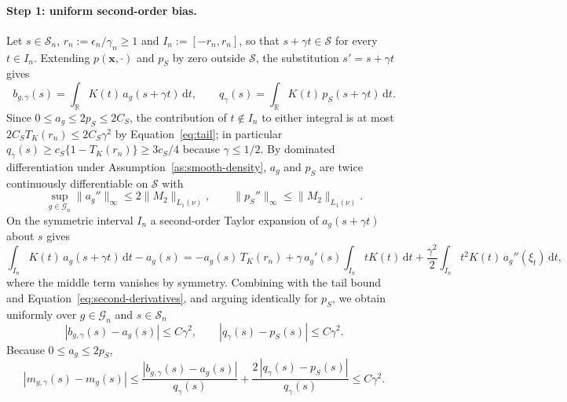 \paragraph{Step 1: uniform second-order bias.}
Let $s\in\mathcal{S}_n$, $r_n:=\epsilon_n/\gamma_n\ge1$ and $I_n:=[-r_n,r_n]$, so that $s+\gamma t\in\mathcal{S}$ for every $t\in I_n$.  Extending $p(\mathbf{x},\cdot)$ and $p_S$ by zero outside $\mathcal{S}$, the substitution $s'=s+\gamma t$ gives
\begin{equation}
  b_{g,\gamma}(s)=\int_{\mathbb{R}}K(t)\,a_g(s+\gamma t)\,\mathrm{d}t,
  \qquad
  q_\gamma(s)=\int_{\mathbb{R}}K(t)\,p_S(s+\gamma t)\,\mathrm{d}t .
  \label{eq:full-mass}
\end{equation}
Since $0\le a_g\le2p_S\le2C_S$, the contribution of $t\notin I_n$ to either integral is at most $2C_ST_K(r_n)\le2C_S\gamma^2$ by Equation~\ref{eq:tail}; in particular $q_\gamma(s)\ge c_S\{1-T_K(r_n)\}\ge3c_S/4$ because $\gamma\le1/2$.  By dominated differentiation under Assumption~\ref{as:smooth-density}, $a_g$ and $p_S$ are twice continuously differentiable on $\mathcal{S}$ with
\begin{equation}
  \sup_{g\in\mathcal{G}_n}\lVert a_g''\rVert_\infty
  \le2\lVert M_2\rVert_{L_1(\nu)},
  \qquad
  \lVert p_S''\rVert_\infty\le\lVert M_2\rVert_{L_1(\nu)} .
  \label{eq:second-derivatives}
\end{equation}
On the symmetric interval $I_n$ a second-order Taylor expansion of $a_g(s+\gamma t)$ about $s$ gives
\[
  \int_{I_n}K(t)\,a_g(s+\gamma t)\,\mathrm{d}t-a_g(s)
  =-a_g(s)\,T_K(r_n)
   +\gamma\,a_g'(s)\int_{I_n}tK(t)\,\mathrm{d}t
   +\frac{\gamma^2}{2}\int_{I_n}t^2K(t)\,a_g''(\xi_t)\,\mathrm{d}t,
\]
where the middle term vanishes by symmetry.  Combining with the tail bound and Equation~\ref{eq:second-derivatives}, and arguing identically for $p_S$, we obtain uniformly over $g\in\mathcal{G}_n$ and $s\in\mathcal{S}_n$
\begin{equation}
  |b_{g,\gamma}(s)-a_g(s)|\le C\gamma^2,
  \qquad
  |q_\gamma(s)-p_S(s)|\le C\gamma^2 .
  \label{eq:bias}
\end{equation}
Because $0\le a_g\le2p_S$,
\begin{equation}
  |m_{g,\gamma}(s)-m_g(s)|
  \le\frac{|b_{g,\gamma}(s)-a_g(s)|}{q_\gamma(s)}
     +\frac{2\,|q_\gamma(s)-p_S(s)|}{q_\gamma(s)}
  \le C\gamma^2 .
  \label{eq:ratio-bias}
\end{equation}


